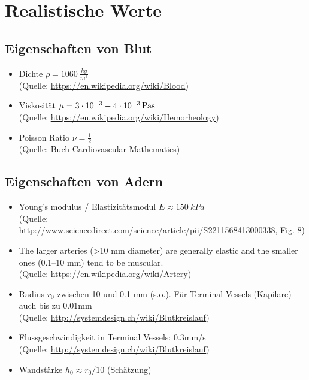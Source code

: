\documentclass[a4paper,12pt]{scrartcl}
\begin{document}
\section*{Realistische Werte}
\subsection*{Eigenschaften von Blut}
\begin{itemize}
  \item Dichte $\rho = \SI{1060}{\frac{kg}{m^3}}$\\
  (Quelle: \url{https://en.wikipedia.org/wiki/Blood})

  \item Viskosität $\mu = \SI{3E-3}{} - \SI{4e-3}{Pa s}$\\
  (Quelle: \url{https://en.wikipedia.org/wiki/Hemorheology})

  \item Poisson Ratio $\nu = \frac{1}{2}$\\
  (Quelle: Buch Cardiovascular Mathematics)

\end{itemize}
\subsection*{Eigenschaften von Adern}
\begin{itemize}
  \item Young's modulus / Elastizitätsmodul $E \approx \SI{150}{kPa}$\\
  (Quelle: \url{http://www.sciencedirect.com/science/article/pii/S2211568413000338}, Fig. 8)
  \item
  The larger arteries (>10 mm diameter) are generally elastic and the smaller ones (0.1–10 mm) tend to be muscular.\\
  (Quelle: \url{https://en.wikipedia.org/wiki/Artery})
  \item Radius $r_0$ zwischen 10 und 0.1 mm (s.o.). Für Terminal Vessels (Kapilare) auch bis zu 0.01mm\\
  (Quelle: \url{http://systemdesign.ch/wiki/Blutkreislauf})
  \item Flussgeschwindigkeit in Terminal Vessels: 0.3mm/s\\
  (Quelle: \url{http://systemdesign.ch/wiki/Blutkreislauf})
  \item Wandstärke $h_0 \approx r_0 / 10$ (Schätzung)
\end{itemize}
\end{document}

